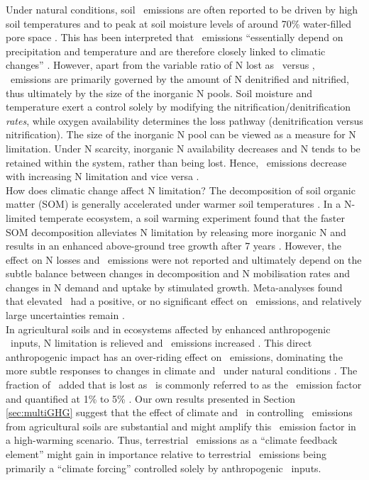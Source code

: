 Under natural conditions, soil \nno\ emissions are often reported to be driven by high soil temperatures and to peak at soil moisture levels of around 70\% water-filled pore space \citep{davidson91, schilt10qsr}. This has been interpreted that \nno\ emissions ``essentially depend on precipitation and temperature and are therefore closely linked to climatic changes'' \citep{fluckiger04}. However, apart from the variable ratio of N lost as \nno\ versus \nn , \nno\ emissions are primarily governed by the amount of N denitrified and nitrified, thus ultimately by the size of the inorganic N pools. Soil moisture and temperature exert a control solely by modifying the nitrification/denitrification {\it rates}, while oxygen availability determines the loss pathway (denitrification versus nitrification). The size of the inorganic N pool can be viewed as a measure for N limitation. Under N scarcity, inorganic N availability decreases and N tends to be retained within the system, rather than being lost. Hence, \nno\ emissions decrease with increasing N limitation and vice versa \citep{davidson07}.\\

How does climatic change affect N limitation? The decomposition of soil organic matter (SOM) is generally accelerated under warmer soil temperatures \citep{knorr05}. In a N-limited temperate ecosystem, a soil warming experiment found that the faster SOM decomposition alleviates N limitation by releasing more inorganic N and results in an enhanced above-ground tree growth after 7 years \citep{melillo11}. However, the effect on N losses and \nno\ emissions were not reported and ultimately depend on the subtle balance between changes in decomposition and N mobilisation rates and changes in N demand and uptake by stimulated growth. Meta-analyses found that elevated \coo\ had a positive, or no significant effect on \nno\ emissions, and relatively large uncertainties remain \citep{vangroenigen11}.\\ 


In agricultural soils and in ecosystems affected by enhanced anthropogenic \nr\ inputs, N limitation is relieved and \nno\ emissions increased \citep{barnard05}. This direct anthropogenic impact has an over-riding effect on \nno\ emissions, dominating the more subtle responses to changes in climate and \coo\ under natural conditions \citep{barnard05, butterbachbahl11}. The fraction of \nr\ added that is lost as \nno\ is commonly referred to as the \nno\ emission factor and quantified at 1\% \citep{IPCC2006} to 5\% \citep{crutzen08atmchemphys,davidson09natgeo}. Our own results presented in Section \ref{sec:multiGHG} suggest that the effect of climate and \coo\ in controlling \nno\ emissions from agricultural soils are substantial and might amplify this \nno\ emission factor in a high-warming scenario. Thus, terrestrial \nno\ emissions as a ``climate feedback element'' might gain in importance relative to terrestrial \nno\ emissions being primarily a ``climate forcing'' controlled solely by anthropogenic \nr\ inputs. 

